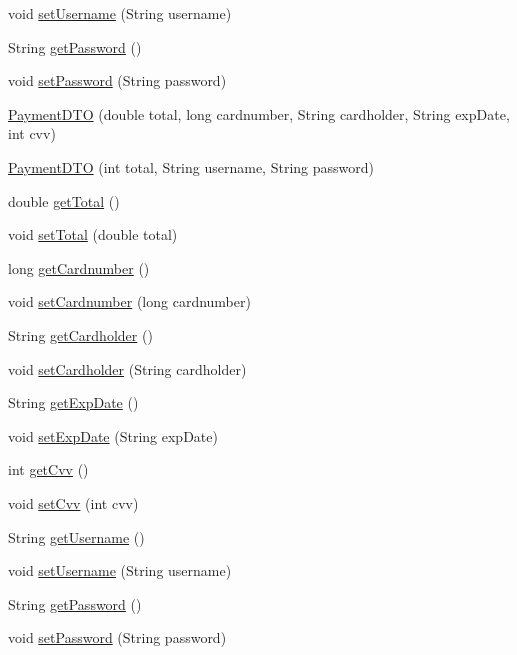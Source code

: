\begin{DoxyCompactItemize}
void \mbox{\hyperlink{class_s_p_q_1_1dto_1_1_payment_d_t_o_aaad1620f8f86cb26566476c22bfcd3af}{set\+Username}} (String username)
\item 
String \mbox{\hyperlink{class_s_p_q_1_1dto_1_1_payment_d_t_o_ae012449dd0baea7f169bb64dcf973dec}{get\+Password}} ()
\item 
void \mbox{\hyperlink{class_s_p_q_1_1dto_1_1_payment_d_t_o_a51a5daa487df2578ca39ede7ae705fb6}{set\+Password}} (String password)
\item 
\mbox{\hyperlink{class_s_p_q_1_1dto_1_1_payment_d_t_o_a4a6f91d0976ce0af97a8f7f15658294c}{Payment\+D\+TO}} (double total, long cardnumber, String cardholder, String exp\+Date, int cvv)
\item 
\mbox{\hyperlink{class_s_p_q_1_1dto_1_1_payment_d_t_o_a409c1e0d8d3b7ed495177258f4eff612}{Payment\+D\+TO}} (int total, String username, String password)
\item 
double \mbox{\hyperlink{class_s_p_q_1_1dto_1_1_payment_d_t_o_a04cd2104d07971407126fcf75ef17d5b}{get\+Total}} ()
\item 
void \mbox{\hyperlink{class_s_p_q_1_1dto_1_1_payment_d_t_o_a07f242511a5b2cd45fdf771203729c1b}{set\+Total}} (double total)
\item 
long \mbox{\hyperlink{class_s_p_q_1_1dto_1_1_payment_d_t_o_ac2a8a2ab315f3027f25780a84da0b824}{get\+Cardnumber}} ()
\item 
void \mbox{\hyperlink{class_s_p_q_1_1dto_1_1_payment_d_t_o_a2b84f1e7da9d3d9966d5170ae0595839}{set\+Cardnumber}} (long cardnumber)
\item 
String \mbox{\hyperlink{class_s_p_q_1_1dto_1_1_payment_d_t_o_ac4812465bc4dd874aad6269fe8486e0b}{get\+Cardholder}} ()
\item 
void \mbox{\hyperlink{class_s_p_q_1_1dto_1_1_payment_d_t_o_a5eea0a93b97ba73b36358c6f5e0ca42e}{set\+Cardholder}} (String cardholder)
\item 
String \mbox{\hyperlink{class_s_p_q_1_1dto_1_1_payment_d_t_o_aa91402a8c96a306fcf125973e4f35912}{get\+Exp\+Date}} ()
\item 
void \mbox{\hyperlink{class_s_p_q_1_1dto_1_1_payment_d_t_o_a6d3d88f07321648bc17e385432ee9044}{set\+Exp\+Date}} (String exp\+Date)
\item 
int \mbox{\hyperlink{class_s_p_q_1_1dto_1_1_payment_d_t_o_a64fb9df59333fcc2a0c8bea48024354d}{get\+Cvv}} ()
\item 
void \mbox{\hyperlink{class_s_p_q_1_1dto_1_1_payment_d_t_o_aee98ca86c3d7e05f98e387faa4f5a3d4}{set\+Cvv}} (int cvv)
\item 
String \mbox{\hyperlink{class_s_p_q_1_1dto_1_1_payment_d_t_o_a31d0edbb3ec64b406e70cd3deaa5ab1a}{get\+Username}} ()
\item 
void \mbox{\hyperlink{class_s_p_q_1_1dto_1_1_payment_d_t_o_aaad1620f8f86cb26566476c22bfcd3af}{set\+Username}} (String username)
\item 
String \mbox{\hyperlink{class_s_p_q_1_1dto_1_1_payment_d_t_o_ae012449dd0baea7f169bb64dcf973dec}{get\+Password}} ()
\item 
void \mbox{\hyperlink{class_s_p_q_1_1dto_1_1_payment_d_t_o_a51a5daa487df2578ca39ede7ae705fb6}{set\+Password}} (String password)
\end{DoxyCompactItemize}


